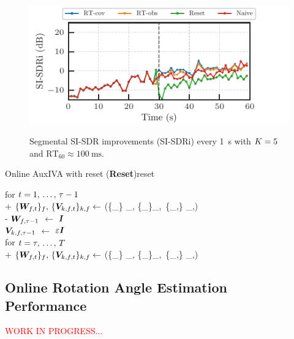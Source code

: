 \documentclass[sip,biber]{now-journal}
\newcommand{\todo}[1]{\textcolor{red}{#1}}
\begin{document}
\begin{figure}[t]
\begin{minipage}[t]{\linewidth}
    \centering\includegraphics{figures/plots/online/Gauss_8000_fft4096_990.pdf}\label{fig:plot:gauss:990}
  \end{minipage}
  \caption{Segmental SI-SDR improvements (SI-SDRi) every \SI{1}{\second} with $K = 5$ and $\text{RT}_{60} \approx \SI{100}{\milli\second}$.}%
  \label{fig:plots:sisdr}
\end{figure}

\begin{algorithm}{Online AuxIVA with reset (\textbf{Reset})}{reset}
  \begin{pseudo}
    for $t = 1,\, \dots,\, \tau - 1$ \\+
      $\{\Demix _{\ft}\}_{\freq},\, \{\cov _{\src,\ft}\} _{\src,\freq} \gets$ (\{\Obs _{\ft}\} _{\freq}, \{\Demix _{\ft[-1]}\}_{\freq},\, \{\cov _{\src,\ft[-1]}\} _{\src,\freq}) \\-
    {$\bm{W} _{f,\tau - 1}$} $\gets$ $\bm{I}$ \ct{$(\forall \freq)$} \\
    {$\bm{V} _{k,f,\tau - 1}$} $\gets$ $\varepsilon \bm{I}$ \ct{$(\forall \src,\freq)$} \\
    for $t = \tau,\, \dots,\, T$ \\+
      $\{\Demix _{\ft}\}_{\freq},\, \{\cov _{\src,\ft}\} _{\src,\freq} \gets$ (\{\Obs _{\ft}\} _{\freq}, \{\Demix _{\ft[-1]}\}_{\freq},\, \{\cov _{\src,\ft[-1]}\} _{\src,\freq})
  \end{pseudo}
\end{algorithm}

\subsection{Online Rotation Angle Estimation Performance}
\todo{WORK IN PROGRESS...}
\end{document}
